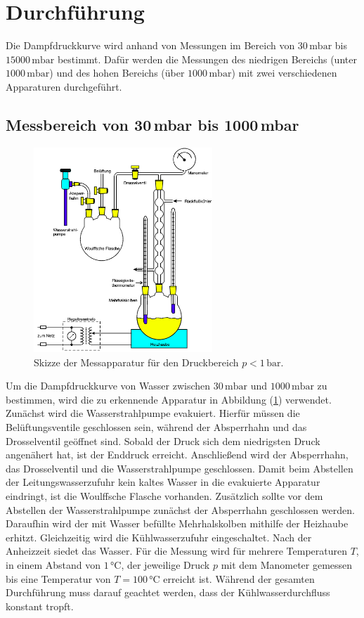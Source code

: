\section{Durchführung}
\label{sec:Durchführung}
Die Dampfdruckkurve wird anhand von Messungen im Bereich von $30\,\unit{\milli\bar}$ bis $15000\, \unit{\milli\bar}$ bestimmt.
Dafür werden die Messungen des niedrigen Bereichs (unter $1000\, \unit{\milli\bar}$) und des hohen Bereichs (über $1000\, \unit{\milli\bar}$)
mit zwei verschiedenen Apparaturen durchgeführt.
\subsection{Messbereich von 30\,mbar bis 1000\,mbar}
\label{sec:ErsteDurchführung}
\begin{figure}[H]
    \centering
    \includegraphics[width=0.60\textwidth]{Erste_Apparatur.png}
    \caption{Skizze der Messapparatur für den Druckbereich $p<1\,\unit{\bar}$. \cite{anleitungV203}}
    \label{fig:ErsteApparatur}
\end{figure}
Um die Dampfdruckkurve von Wasser zwischen $30\,\unit{\milli\bar}$ und $1000\,\unit{\milli\bar}$ zu bestimmen, wird die zu erkennende Apparatur in Abbildung
(\ref{fig:ErsteApparatur}) verwendet. Zunächst wird die Wasserstrahlpumpe evakuiert. Hierfür müssen die Belüftungsventile geschlossen sein, während der Absperrhahn
und das Drosselventil geöffnet sind. Sobald der Druck sich dem niedrigsten Druck angenähert hat, ist der Enddruck erreicht.  
Anschließend wird der Absperrhahn, das Drosselventil und die Wasserstrahlpumpe geschlossen. Damit beim Abstellen der Leitungswasserzufuhr kein kaltes Wasser in die
evakuierte Apparatur eindringt, ist die Woulffsche Flasche vorhanden. Zusätzlich sollte vor dem Abstellen der Wasserstrahlpumpe zunächst der Absperrhahn geschlossen werden.
Daraufhin wird der mit Wasser befüllte Mehrhalskolben mithilfe der Heizhaube erhitzt. Gleichzeitig wird die Kühlwasserzufuhr eingeschaltet. Nach der Anheizzeit siedet das Wasser.
Für die Messung wird für mehrere Temperaturen $T$, in einem Abstand von $1\,\unit{\celsius}$, der jeweilige Druck $p$ mit dem Manometer gemessen bis eine Temperatur von $T= 100\,\unit{\celsius}$ erreicht ist.
Während der gesamten Durchführung muss darauf geachtet werden, dass der Kühlwasserdurchfluss konstant tropft.
